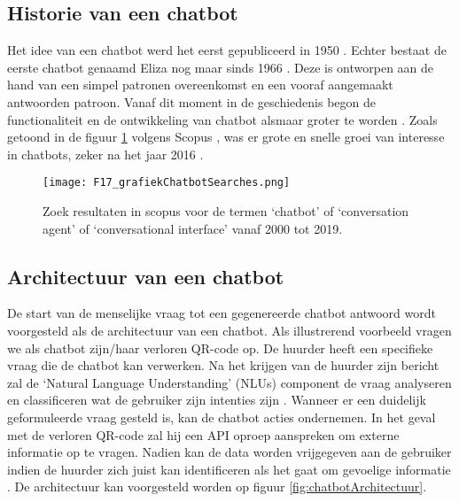 \subsection{Historie van een chatbot}%
\label{sec:chatbotHistorie}

Het idee van een chatbot werd het eerst gepubliceerd in 1950 \autocite{Turing2009}. Echter bestaat de eerste chatbot genaamd Eliza nog maar sinds 1966 \autocite{Weizenbaum1966}. Deze is ontworpen aan de hand van een simpel patronen overeenkomst en een vooraf aangemaakt antwoorden patroon.  Vanaf dit moment in de geschiedenis begon de functionaliteit en de ontwikkeling van chatbot alsmaar groter te worden \autocite{Brandtzaeg2017}. Zoals getoond in de figuur \ref{fig:graphDocusChatbotAYear} volgens Scopus \autocite{Elsevier2004}, was er grote en snelle groei van interesse in chatbots, zeker na het jaar 2016 \autocite{Adamopoulou2020}.

\begin{figure}[h]
    \centering
    \texttt{[image: F17\_grafiekChatbotSearches.png]}
    \captionsetup{justification=centering, singlelinecheck=false}    
    \caption{Zoek resultaten in scopus voor de termen ‘chatbot’ of ‘conversation agent’ of ‘conversational interface’ vanaf 2000 tot 2019.}
    \label{fig:graphDocusChatbotAYear}
\end{figure}


\subsection{Architectuur  van een chatbot}%
\label{sec:chatbotArchitectuur}

De start van de menselijke vraag tot een gegenereerde chatbot antwoord wordt voorgesteld als de architectuur van een chatbot. Als illustrerend voorbeeld vragen we als chatbot zijn/haar verloren QR-code op. De huurder heeft een specifieke vraag die de chatbot kan verwerken. Na het krijgen van de huurder zijn bericht zal de ‘Natural Language Understanding’ (NLUs) \autocite{Khanna2015} component de vraag analyseren en classificeren wat de gebruiker zijn intenties zijn \autocite{Tamrakar2021}. Wanneer er een duidelijk geformuleerde vraag gesteld is, kan de chatbot acties ondernemen. In het geval met de verloren QR-code zal hij een API oproep aanspreken om externe informatie op te vragen. Nadien kan de data worden vrijgegeven aan de gebruiker indien de huurder zich juist kan identificeren als het gaat om gevoelige informatie \autocite{Adamopoulou2020}. De architectuur kan voorgesteld worden op figuur \ref{fig:chatbotArchitectuur}.

